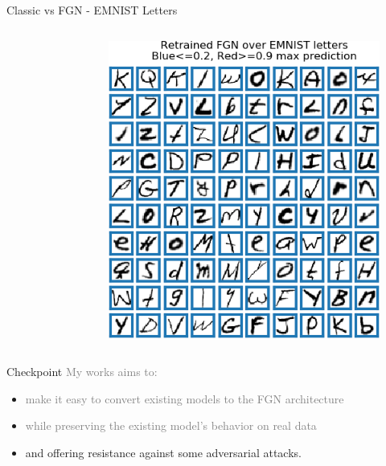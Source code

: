 \documentclass{beamer}
\begin{document}
\begin{frame}{Classic vs FGN - EMNIST Letters \cite{cohen2017emnist}}
\begin{columns}
\begin{column}{.33\textwidth}
\begin{figure}
    \end{figure}
    \end{column}
    \begin{column}{.33\textwidth}
    \begin{figure}
        \centering
        \includegraphics[width=.85\textwidth]{images/Letters/retrained-letters.png}
    \end{figure}
    \end{column}
    \end{columns}
    
\end{frame}


\begin{frame}{Checkpoint}
\textcolor{gray}{My works aims to:}
\begin{itemize}
    \item \textcolor{gray}{make it easy to convert existing models to the FGN architecture}
    \item \textcolor{gray}{while preserving the existing model's behavior on real data}
    \item and offering resistance against some adversarial attacks.
\end{itemize}
    
\end{frame}
\end{document}
